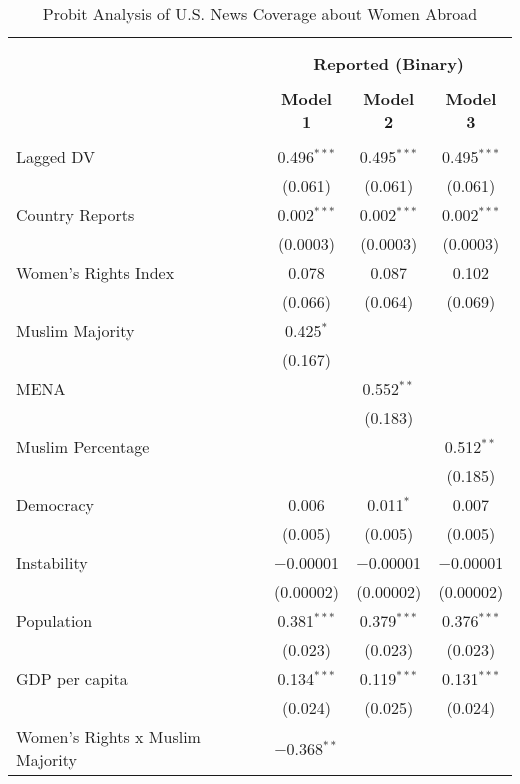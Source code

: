 
\begin{table}[!htbp] \centering 
  \caption{Probit Analysis of U.S. News Coverage about Women Abroad} 
  \label{table:probit} 
\begin{tabular}{@{\extracolsep{5pt}}lccc} 
\\[-1.8ex]\hline \\[-1.8ex] 
\\[-1.8ex] & \multicolumn{3}{c}{\textbf{Reported (Binary)}} \\ 
\\[-1.8ex] & \textbf{Model 1} & \textbf{Model 2} & \textbf{Model 3}\\ 
\hline \\[-1.8ex] 
 Lagged DV & 0.496$^{***}$ & 0.495$^{***}$ & 0.495$^{***}$ \\ 
  & (0.061) & (0.061) & (0.061) \\ 
  Country Reports & 0.002$^{***}$ & 0.002$^{***}$ & 0.002$^{***}$ \\ 
  & (0.0003) & (0.0003) & (0.0003) \\ 
  Women's Rights Index & 0.078 & 0.087 & 0.102 \\ 
  & (0.066) & (0.064) & (0.069) \\ 
  Muslim Majority & 0.425$^{*}$ &  &  \\ 
  & (0.167) &  &  \\ 
  MENA &  & 0.552$^{**}$ &  \\ 
  &  & (0.183) &  \\ 
  Muslim Percentage &  &  & 0.512$^{**}$ \\ 
  &  &  & (0.185) \\ 
  Democracy & 0.006 & 0.011$^{*}$ & 0.007 \\ 
  & (0.005) & (0.005) & (0.005) \\ 
  Instability & $-$0.00001 & $-$0.00001 & $-$0.00001 \\ 
  & (0.00002) & (0.00002) & (0.00002) \\ 
  Population & 0.381$^{***}$ & 0.379$^{***}$ & 0.376$^{***}$ \\ 
  & (0.023) & (0.023) & (0.023) \\ 
  GDP per capita & 0.134$^{***}$ & 0.119$^{***}$ & 0.131$^{***}$ \\ 
  & (0.024) & (0.025) & (0.024) \\ 
  Women's Rights x Muslim Majority & $-$0.368$^{**}$ &  &  \\ 

\end{tabular}
\end{table}
